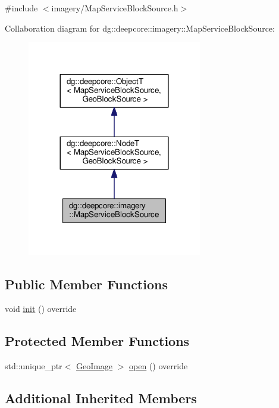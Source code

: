 {\ttfamily \#include $<$imagery/\+Map\+Service\+Block\+Source.\+h$>$}



Collaboration diagram for dg\+:\+:deepcore\+:\+:imagery\+:\+:Map\+Service\+Block\+Source\+:
\nopagebreak
\begin{figure}[H]
\begin{center}
\leavevmode
\includegraphics[width=216pt]{classdg_1_1deepcore_1_1imagery_1_1_map_service_block_source__coll__graph}
\end{center}
\end{figure}
\subsection*{Public Member Functions}
\begin{DoxyCompactItemize}
\item 
void \hyperlink{classdg_1_1deepcore_1_1imagery_1_1_map_service_block_source_a18059804158ebc367a3538f3c80a1f9d}{init} () override
\end{DoxyCompactItemize}
\subsection*{Protected Member Functions}
\begin{DoxyCompactItemize}
\item 
std\+::unique\+\_\+ptr$<$ \hyperlink{classdg_1_1deepcore_1_1imagery_1_1_geo_image}{Geo\+Image} $>$ \hyperlink{classdg_1_1deepcore_1_1imagery_1_1_map_service_block_source_a327277721c4418211928a49ae3cf1a3e}{open} () override
\end{DoxyCompactItemize}
\subsection*{Additional Inherited Members}


